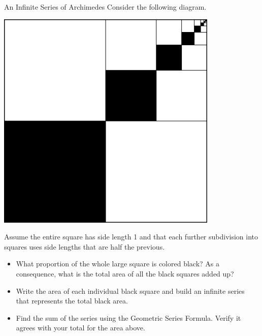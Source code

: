\begin{exercise}{An Infinite Series of Archimedes \Coffeecup \Coffeecup \Coffeecup } Consider the following diagram.

	\begin{center}
		\includegraphics[width=300pt]{ChapterSeqSer/Figures/archimedessquare.eps}
	\end{center}

\vspace*{.1in}

Assume the entire square has side length 1 and that each further subdivision into squares uses side lengths that are half the previous.  

\begin{itemize}

\item What proportion of the whole large square is colored black?  As a consequence, what is the total area of all the black squares added up?

\vspace*{.5in}

\item Write the area of each individual black square and build an infinite series that represents the total black area.

\vspace*{.5in}

\item Find the sum of the series using the Geometric Series Formula. Verify it agrees with your total for the area above.

\vspace*{.5in}


\end{itemize}
\end{exercise}
